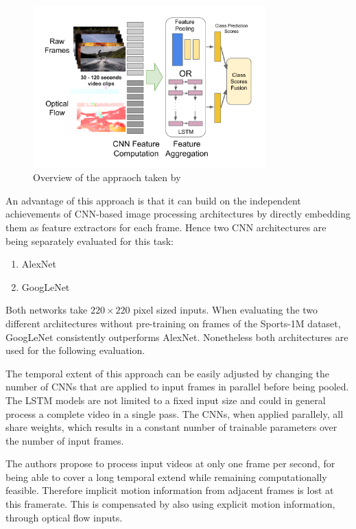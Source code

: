 \begin{figure}[H]
    \centering
    \includegraphics[width=0.8\textwidth]{img_deep/beyondshort_overview}
    \caption{Overview of the appraoch taken by \textcite{ng_beyond_2015}}
    \label{fig:beyondshort_overview}
\end{figure}

An advantage of this approach is that it can build on the independent achievements of CNN-based image processing architectures by directly embedding them as feature extractors for each frame.
Hence two CNN architectures are being separately evaluated for this task:

\begin{enumerate}
    \item AlexNet \cite{krizhevsky_imagenet_2012}
    \item GoogLeNet \cite{szegedy_going_2015}
\end{enumerate}

Both networks take $220\times220$ pixel sized inputs.
When evaluating the two different architectures without pre-training on frames of the Sports-1M dataset, GoogLeNet consistently outperforms AlexNet.
Nonetheless both architectures are used for the following evaluation.

The temporal extent of this approach can be easily adjusted by changing the number of CNNs that are applied to input frames in parallel before being pooled.
The LSTM models are not limited to a fixed input size and could in general process a complete video in a single pass.
The CNNs, when applied parallely, all share weights, which results in a constant number of trainable parameters over the number of input frames.

The authors propose to process input videos at only one frame per second, for being able to cover a long temporal extend while remaining computationally feasible.
Therefore implicit motion information from adjacent frames is lost at this framerate.
This is compensated by also using explicit motion information, through optical flow inputs.

